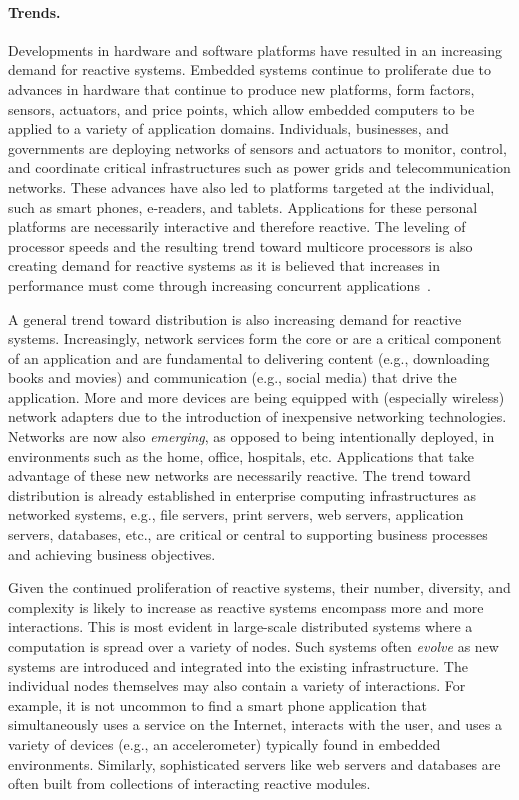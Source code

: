 \paragraph{Trends.}
Developments in hardware and software platforms have resulted in an increasing demand for reactive systems.
Embedded systems continue to proliferate due to advances in hardware that continue to produce new platforms, form factors, sensors, actuators, and price points, which allow embedded computers to be applied to a variety of application domains.
Individuals, businesses, and governments are deploying networks of sensors and actuators to monitor, control, and coordinate critical infrastructures such as power grids and telecommunication networks.
These advances have also led to platforms targeted at the individual, such as smart phones, e-readers, and tablets.
Applications for these personal platforms are necessarily interactive and therefore reactive.
The leveling of processor speeds and the resulting trend toward multicore processors is also creating demand for reactive systems as it is believed that increases in performance must come through increasing concurrent applications~\cite{sutter2005software}.

A general trend toward distribution is also increasing demand for reactive systems.
Increasingly, network services form the core or are a critical component of an application and are fundamental to delivering content (e.g., downloading books and movies) and communication (e.g., social media) that drive the application.
More and more devices are being equipped with (especially wireless) network adapters due to the introduction of inexpensive networking technologies.
Networks are now also \emph{emerging}, as opposed to being intentionally deployed, in environments such as the home, office, hospitals, etc.
Applications that take advantage of these new networks are necessarily reactive.
The trend toward distribution is already established in enterprise computing infrastructures as networked systems, e.g., file servers, print servers, web servers, application servers, databases, etc., are critical or central to supporting business processes and achieving business objectives.

Given the continued proliferation of reactive systems, their number, diversity, and complexity is likely to increase as reactive systems encompass more and more interactions.
This is most evident in large-scale distributed systems where a computation is spread over a variety of nodes.
Such systems often \emph{evolve} as new systems are introduced and integrated into the existing infrastructure.
The individual nodes themselves may also contain a variety of interactions.
For example, it is not uncommon to find a smart phone application that simultaneously uses a service on the Internet, interacts with the user, and uses a variety of devices (e.g., an accelerometer) typically found in embedded environments.
Similarly, sophisticated servers like web servers and databases are often built from collections of interacting reactive modules.

